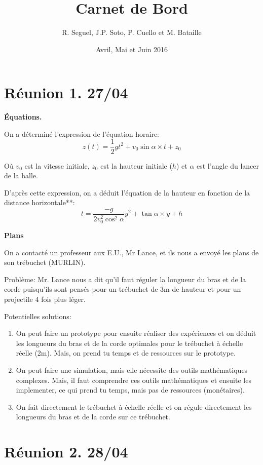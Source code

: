 \documentclass[10pt]{article}
\begin{document}
 
\title{Carnet de Bord}
\author{R. Seguel, J.P. Soto, P. Cuello et M. Bataille}
\date{Avril, Mai et Juin 2016}
\maketitle
 \section{Réunion 1. 27/04}


{\bf Équations.}

On a déterminé
l'expression de l'équation horaire:
$$ z(t) = \frac{1}{2}gt^2+v_0\sin\alpha\times t+z_0$$

Où $v_0$ est la vitesse initiale, $z_0$ est la hauteur
initiale ($h$) et $\alpha$ est l'angle du lancer de la balle.

D'après cette expression, on a déduit l'équation de la
hauteur en fonction de la distance horizontale**:
$$ t=\frac{-g}{2v_0^2\cos^2\alpha}y^2+\tan\alpha\times y+h $$

{\bf Plans}

On a contacté un professeur aux E.U., Mr Lance, et ils nous
a envoyé les plans de son trébuchet (MURLIN).

Problème: Mr. Lance nous a dit qu'il faut réguler la
 longueur du bras et de la corde puisqu'ils sont pensés pour
 un trébuchet de 3m de hauteur et pour un projectile 4 fois plus léger.
 
 Potentielles solutions:
\begin{enumerate}
 \item On peut faire un prototype pour ensuite réaliser des expériences
 et on déduit les longueurs du bras et de la corde optimales
 pour le trébuchet à échelle réelle (2m). Mais, on prend tu temps
 et de ressources sur le prototype.
 \item  On peut faire une simulation, mais elle
 nécessite des outils mathématiques complexes. Mais, il faut comprendre ces outils mathématiques
 et ensuite les implementer, ce qui prend tu temps, mais pas
 de ressources (monétaires).
 \item  On fait directement le trébuchet à échelle
 réelle et on régule directement les longueurs du bras et de
 la corde sur ce trébuchet.
\end{enumerate}

\vspace{1cm}
\section{Réunion 2. 28/04}
\end{document}
